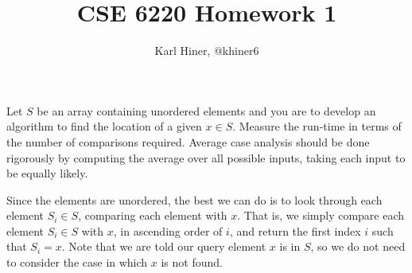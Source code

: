 \documentclass[twoside,10pt]{article}
\begin{document}
\title{CSE 6220 Homework 1}
\author{Karl Hiner, @khiner6}
\date{}
\maketitle

\section{}

Let $S$ be an array containing unordered elements and you are to develop an algorithm to find the location of a given $x \in S$.
Measure the run-time in terms of the number of comparisons required.
Average case analysis should be done rigorously by computing the average over all possible inputs, taking each input to be equally likely.

\quad Since the elements are unordered, the best we can do is to look through each element $S_i \in S$, comparing each element with $x$.
That is, we simply compare each element $S_i \in S$ with $x$, in ascending order of $i$, and return the first index $i$ such that $S_i = x$.
Note that we are told our query element $x$ is in $S$, so we do not need to consider the case in which $x$ is not found.
\end{document}
